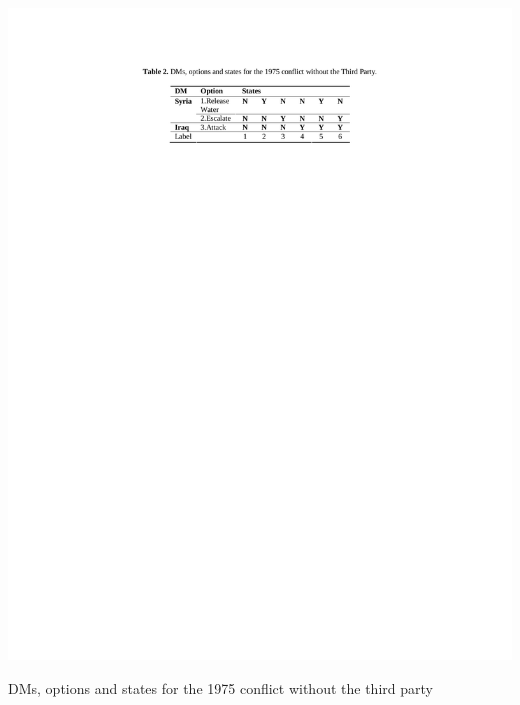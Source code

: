 \documentclass[letterpaper,12pt,titlepage,oneside,final]{book}
\begin{document}
\begin{table}[H]
\centering
\includegraphics[scale=1]{PDF-IMG/tables/2.pdf}

\caption{DMs, options and states for the 1975 conflict without the third party}

\label{tbl:t2}
\end{table}
\end{document}
